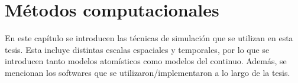 \chapter{Métodos computacionales}\label{ch:metodos}
\thispagestyle{empty}

\vspace{50pt}

\begin{adjustwidth}{50pt}{50pt}
    En este capítulo se introducen las técnicas de simulación que se utilizan
    en esta tesis. Esta incluye distintas escalas espaciales y temporales, por 
    lo que se introducen tanto modelos atomísticos como modelos del continuo.
    Además, se mencionan los softwares que se utilizaron/implementaron a lo largo
    de la tesis.
\end{adjustwidth}

\clearpage
\newpage
\thispagestyle{empty}
\mbox{}
\newpage








